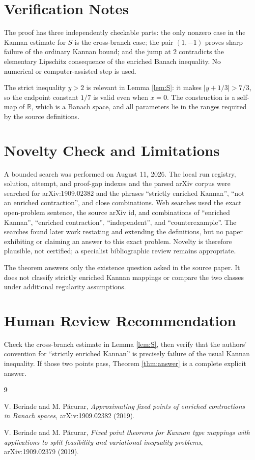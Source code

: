 \documentclass[11pt]{amsart}
\newcommand{\R}{\mathbb R}
\begin{document}
\section*{Verification Notes}

The proof has three independently checkable parts: the only nonzero case in
the Kannan estimate for $S$ is the cross-branch case; the pair
$(1,-1)$ proves sharp failure of the ordinary Kannan bound; and the jump at
$2$ contradicts the elementary Lipschitz consequence of the enriched
Banach inequality. No numerical or computer-assisted step is used.

The strict inequality $y>2$ is relevant in Lemma \ref{lem:S}: it makes
$|y+1/3|>7/3$, so the endpoint constant $1/7$ is valid even when $x=0$.
The construction is a self-map of $\R$, which is a Banach space, and all
parameters lie in the ranges required by the source definitions.

\section*{Novelty Check and Limitations}

A bounded search was performed on August 11, 2026. The local run registry,
solution, attempt, and proof-gap indexes and the parsed arXiv corpus were
searched for arXiv:1909.02382 and the phrases ``strictly enriched Kannan'',
``not an enriched contraction'', and close combinations. Web searches used
the exact open-problem sentence, the source arXiv id, and combinations of
``enriched Kannan'', ``enriched contraction'', ``independent'', and
``counterexample''. The searches found later work restating and extending the
definitions, but no paper exhibiting or claiming an answer to this exact
problem. Novelty is therefore plausible, not certified; a specialist
bibliographic review remains appropriate.

The theorem answers only the existence question asked in the source paper. It
does not classify strictly enriched Kannan mappings or compare the two classes
under additional regularity assumptions.

\section*{Human Review Recommendation}

Check the cross-branch estimate in Lemma \ref{lem:S}, then verify that the
authors' convention for ``strictly enriched Kannan'' is precisely failure of
the usual Kannan inequality. If those two points pass, Theorem
\ref{thm:answer} is a complete explicit answer.

\begin{thebibliography}{9}

V. Berinde and M. P\u acurar,
\emph{Approximating fixed points of enriched contractions in Banach spaces},
arXiv:1909.02382 (2019).

V. Berinde and M. P\u acurar,
\emph{Fixed point theorems for Kannan type mappings with applications to split
feasibility and variational inequality problems},
arXiv:1909.02379 (2019).

\end{thebibliography}
\end{document}
